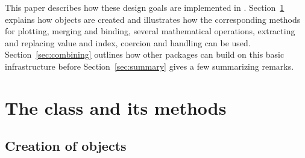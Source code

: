 \documentclass{Z}
\begin{document}
This paper describes how these design goals are implemented in .
Section~\ref{sec:zoo-class} explains how  objects are created
and illustrates how the corresponding methods for plotting, merging and
binding, several mathematical operations, extracting and replacing value
and index, coercion and  handling can be used. Section~\ref{sec:combining}
outlines how other packages can build on this basic infrastructure
before Section~\ref{sec:summary} gives a few summarizing remarks.

\clearpage

\section[The class "zoo" and its methods]{The class  and its methods}
\label{sec:zoo-class}


\subsection[Creation of "zoo" objects]{Creation of  objects}
\label{sec:zoo}
\end{document}
